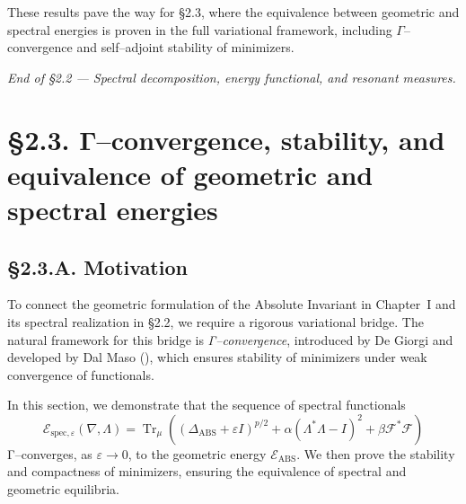 These results pave the way for §2.3, where the equivalence between geometric and spectral energies is proven in the full variational framework, including $\Gamma$–convergence and self–adjoint stability of minimizers.

\begin{center}
\textit{End of §2.2 — Spectral decomposition, energy functional, and resonant measures.}
\end{center}


\section{§2.3. Γ–convergence, stability, and equivalence of geometric and spectral energies}
\label{sec:2.3-gamma}

\subsection*{§2.3.A. Motivation}

To connect the geometric formulation of the Absolute Invariant in Chapter~I and its spectral realization in §2.2, we require a rigorous variational bridge.
The natural framework for this bridge is \emph{Γ–convergence}, introduced by De Giorgi and developed by Dal Maso (\cite{DalMaso1993}), which ensures stability of minimizers under weak convergence of functionals.

In this section, we demonstrate that the sequence of spectral functionals 
\[
\mathcal{E}_{\mathrm{spec},\varepsilon}(\nabla,\Lambda)
=\operatorname{Tr}_\mu\!\left(
(\Delta_{\mathrm{ABS}}+\varepsilon I)^{p/2}
+\alpha(\Lambda^\ast\Lambda-I)^2
+\beta\mathcal{F}^\ast\mathcal{F}
\right)
\]
Γ–converges, as $\varepsilon\to0$, to the geometric energy $\mathcal{E}_{\mathrm{ABS}}$.
We then prove the stability and compactness of minimizers, ensuring the equivalence of spectral and geometric equilibria.

